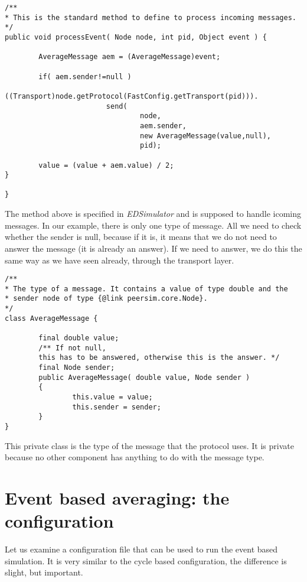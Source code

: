 \documentclass[a4paper,11pt]{article}
\begin{document}
\footnotesize
\begin{verbatim}
/**
* This is the standard method to define to process incoming messages.
*/
public void processEvent( Node node, int pid, Object event ) {
                
        AverageMessage aem = (AverageMessage)event;
        
        if( aem.sender!=null )
                ((Transport)node.getProtocol(FastConfig.getTransport(pid))).
                        send(
                                node,
                                aem.sender,
                                new AverageMessage(value,null),
                                pid);
                                
        value = (value + aem.value) / 2;
}

}
\end{verbatim}
\normalsize

The method above is specified in \emph{EDSimulator} and is supposed to
handle icoming messages.
In our example, there is only one type of message.
All we need to check whether the sender is null, because if it is, it
means that we do not need to answer the message (it is already an answer).
If we need to answer, we do this the same way as we have seen already, through
the transport layer.

\footnotesize
\begin{verbatim}
/**
* The type of a message. It contains a value of type double and the
* sender node of type {@link peersim.core.Node}.
*/
class AverageMessage {

        final double value;
        /** If not null,
        this has to be answered, otherwise this is the answer. */
        final Node sender;
        public AverageMessage( double value, Node sender )
        {
                this.value = value;
                this.sender = sender;
        }
}

\end{verbatim}
\normalsize

This private class is the type of the message that the protocol uses.
It is private because no other component has anything to do with the
message type.

\section{Event based averaging: the configuration}

Let us examine a configuration file that can be used to run the event based
simulation.
It is very similar to the cycle based configuration, the difference is
slight, but important.
\end{document}
